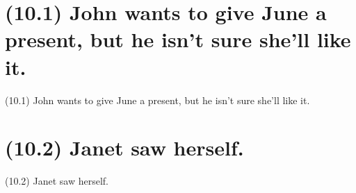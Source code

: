 \documentclass{article}
\begin{document}
\clearpage

%
%

\section*{(10.1) John wants to give June a present, but he isn't sure she’ll like it.}

\bigbreak
\begin{enumerate*}
\item[(10.1)] John wants to give June a present, but he isn't sure she’ll like it.
\end{enumerate*}
\bigbreak

\bigbreak
\begin{minipage}{\textwidth}
\end{minipage}
\bigbreak

\clearpage

%
%

\section*{(10.2) Janet saw herself.}

\bigbreak
\begin{enumerate*}
\item[(10.2)] Janet saw herself.
\end{enumerate*}
\bigbreak
\end{document}
